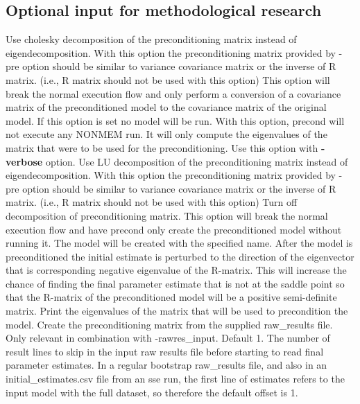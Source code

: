 \subsection{Optional input for methodological research}

\begin{optionlist}
Use cholesky decomposition of the preconditioning matrix instead of eigendecomposition.  With this option the preconditioning matrix provided by -pre option should be similar to variance covariance matrix or the inverse of R matrix.  (i.e., R matrix should not be used with this option)
\nextopt
{}
This option will break the normal execution flow and only perform a conversion of a covariance matrix of the preconditioned model to the covariance matrix of the original model.
If this option is set no model will be run.
\nextopt
{}
With this option, precond will not execute any NONMEM run.  It will only compute the eigenvalues of the matrix that were to be used for the preconditioning.  Use this option with {\bf-verbose} option.
\nextopt	
{}
Use LU decomposition of the preconditioning matrix instead of eigendecomposition.  With this option the preconditioning matrix provided by -pre option should be similar to variance covariance matrix or the inverse of R matrix.  (i.e., R matrix should not be used with this option)
\nextopt
{}
Turn off decomposition of preconditioning matrix.
\nextopt
{}
This option will break the normal execution flow and have precond only create the preconditioned model without running it.
The model will be created with the specified name.
\nextopt
{}
After the model is preconditioned the initial estimate is perturbed to the direction of the eigenvector that is corresponding negative eigenvalue of the R-matrix.  This will increase the chance of finding the final parameter estimate that is not at the saddle point so that the R-matrix of the preconditioned model will be a positive semi-definite matrix.
\nextopt
{}
Print the eigenvalues of the matrix that will be used to precondition the model.
\nextopt
{}
Create the preconditioning matrix from the supplied raw\_results file.
\nextopt
{}
Only relevant in combination with -rawres\_input. Default 1. The number of result lines to skip in the input raw results file before starting to read final parameter estimates. In a regular bootstrap raw\_results file, and also in an initial\_estimates.csv file from an sse run, the first line of estimates refers to the input model with the full dataset, so therefore the default offset is 1.

\end{optionlist}
